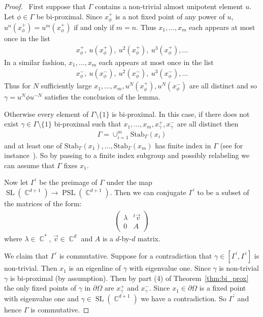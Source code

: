 \documentclass[12pt]{amsart}
\theoremstyle{plain}
\theoremstyle{definition}
\theoremstyle{remark}
\begin{document}
\begin{proof}\
First suppose that $\Gamma$ contains a non-trivial almost unipotent element $u$. Let $\phi \in \Gamma$ be bi-proximal. Since $x^+_{\phi}$ is a not fixed point of any power of $u$, $u^n(x^+_{\phi}) = u^m( x^+_{\phi})$ if and only if $m=n$. Thus $x_1,\dots, x_m$ each appears at most once in the list 
\begin{align*}
x^+_{\phi}, \ u(x^+_{\phi}), \ u^2(x^+_{\phi}), \ u^3(x^+_{\phi}), \dots
\end{align*}
In a similar fashion, $x_1,\dots, x_m$ each appears at most once in the list 
\begin{align*}
x^-_{\phi}, \ u(x^-_{\phi}), \ u^2(x^-_{\phi}), \ u^3(x^-_{\phi}), \dots
\end{align*}
Thus for $N$ sufficiently large $x_1,\dots,x_m,u^N (x^+_{\phi}), u^N(x^-_{\phi})$ are all distinct and so $\gamma = u^N \phi u^{-N}$ satisfies the conclusion of the lemma.

Otherwise every element of $\Gamma \setminus \{1\}$ is bi-proximal. In this case, if there does not exist  $\gamma \in \Gamma \setminus \{1\}$ bi-proximal such that $x_1,\dots, x_m,x^+_{\gamma}, x^-_{\gamma}$ are all distinct then 
\begin{align*}
\Gamma = \cup_{i=1}^m \textrm{Stab}_{\Gamma}(x_i)
\end{align*}
and at least one of $\mathrm{Stab}_{\Gamma}(x_1), \dots, \mathrm{Stab}_{\Gamma}(x_m)$ has finite index in $\Gamma$ (see for instance~\cite[Lemma 4.1]{N1954}). So by passing to a finite index subgroup and possibly relabeling we can assume that $\Gamma$ fixes $x_1$. 

Now let $\Gamma^\prime$ be the preimage of $\Gamma$ under the map $\operatorname{SL}(\operatorname{\mathbb{C}}^{d+1}) \rightarrow \operatorname{PSL}(\operatorname{\mathbb{C}}^{d+1})$. Then we can conjugate $\Gamma^\prime$ to be a subset of the matrices of the form:
\begin{align*}
\begin{pmatrix}
\lambda & ^t\vec{v}\\
0 & A 
\end{pmatrix}
\end{align*}
where $\lambda \in \operatorname{\mathbb{C}}^*$, $\vec{v} \in \operatorname{\mathbb{C}}^d$ and $A$ is a $d$-by-$d$ matrix. 

We claim that $\Gamma^\prime$ is commutative. Suppose for a contradiction that $\gamma \in [\Gamma^\prime, \Gamma^\prime]$ is non-trivial.  Then $x_1$ is an eigenline of $\gamma$ with eigenvalue  one. Since $\gamma$ is non-trivial $\gamma$ is bi-proximal (by assumption). Then by part (4) of Theorem~\ref{thm:bi_prox} the only fixed points of $\gamma$ in $\partial \Omega$ are $x^+_{\gamma}$ and $x^-_{\gamma}$. Since $x_1 \in \partial \Omega$ is a fixed point with eigenvalue one and $\gamma \in \operatorname{SL}(\operatorname{\mathbb{C}}^{d+1})$ we have a contradiction. So $\Gamma^\prime$ and hence $\Gamma$ is commutative. 


\end{proof}
\end{document}
